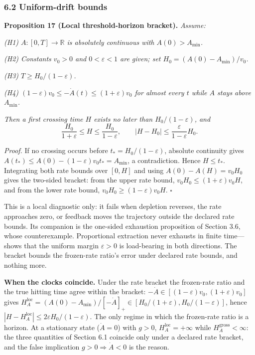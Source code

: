 \documentclass[11pt]{article}
\begin{document}
\subsubsection{6.2 Uniform-drift bounds}\label{uniform-drift-bounds}

\textbf{Proposition 17 (Local threshold-horizon bracket).}
\emph{Assume:}

\emph{(H1) \(A : [0,T] \to \mathbb{R}\) is absolutely continuous with
\(A(0) > A_{\min}\).}

\emph{(H2) Constants \(v_0 > 0\) and \(0 < \varepsilon < 1\) are given;
set \(H_0 = (A(0) - A_{\min})/v_0\).}

\emph{(H3) \(T \ge H_0/(1-\varepsilon)\).}

\emph{(H4) \((1-\varepsilon)v_0 \le -\dot A(t) \le (1+\varepsilon)v_0\)
for almost every \(t\) while \(A\) stays above \(A_{\min}\).}

\emph{Then a first crossing time \(H\) exists no later than
\(H_0/(1-\varepsilon)\), and}
\[\frac{H_0}{1+\varepsilon} \le H \le \frac{H_0}{1-\varepsilon}, \qquad |H - H_0| \le \frac{\varepsilon}{1-\varepsilon}H_0.\]

\emph{Proof.} If no crossing occurs before \(t_* = H_0/(1-\varepsilon)\), absolute continuity gives \(A(t_*) \le A(0) - (1-\varepsilon)v_0 t_* = A_{\min}\), a contradiction. Hence \(H \le t_*\). Integrating both rate bounds over \([0,H]\) and using \(A(0) - A(H) = v_0 H_0\) gives the two-sided bracket: from the upper rate bound, \(v_0 H_0 \le (1+\varepsilon) v_0 H\), and from the lower rate bound, \(v_0 H_0 \ge (1-\varepsilon) v_0 H\). \ensuremath{\square}

This is a local diagnostic only: it fails when depletion reverses, the rate approaches zero, or feedback moves the trajectory outside the declared rate bounds. Its companion is the one-sided exhaustion proposition of Section 3.6, whose counterexample. Proportional extraction never exhausts in finite time---shows that the uniform margin \(\varepsilon > 0\) is load-bearing in both directions. The bracket bounds the frozen-rate ratio's error under declared rate bounds, and nothing more.

\textbf{When the clocks coincide.} Under the rate bracket the frozen-rate ratio and the true hitting time agree within the bracket: \(-\dot A \in [(1-\varepsilon)v_0, (1+\varepsilon)v_0]\) gives \(H_A^{\mathrm{loc}} = (A(0) - A_{\min})/[-\dot A]_+ \in [H_0/(1+\varepsilon), H_0/(1-\varepsilon)]\), hence \(|H - H_A^{\mathrm{loc}}| \le 2\varepsilon H_0/(1-\varepsilon)\). The only regime in which the frozen-rate ratio is a horizon. At a stationary state (\(\dot A = 0\)) with \(g > 0\), \(H_A^{\mathrm{loc}} = +\infty\) while \(H_A^{\mathrm{gross}} < \infty\): the three quantities of Section 6.1 coincide only under a declared rate bracket, and the false implication \(g > 0 \Rightarrow \dot A < 0\) is the reason.
\end{document}
